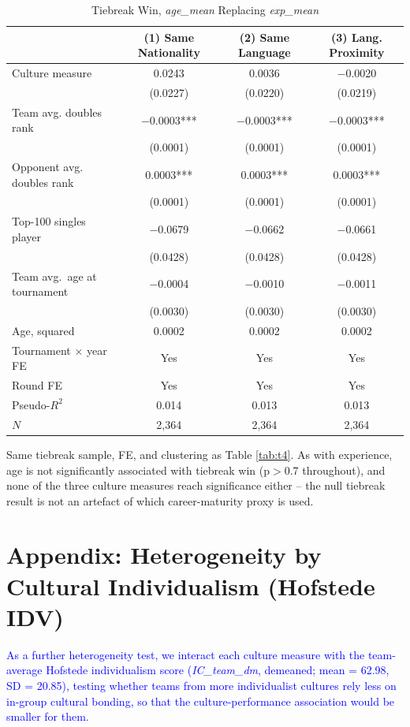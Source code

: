 \documentclass[10pt]{article}
\begin{document}
\begin{table}[htbp]
\color{blue}
\centering
\caption{Tiebreak Win, \textit{age\_mean} Replacing \textit{exp\_mean} \label{tab:ta3}}
\begin{threeparttable}
\begin{tabular}{lccc}
\toprule
 & (1) Same Nationality & (2) Same Language & (3) Lang. Proximity \\
\midrule
Culture measure & 0.0243 & 0.0036 & $-$0.0020 \\
 & (0.0227) & (0.0220) & (0.0219) \\
Team avg. doubles rank & $-$0.0003*** & $-$0.0003*** & $-$0.0003*** \\
 & (0.0001) & (0.0001) & (0.0001) \\
Opponent avg. doubles rank & 0.0003*** & 0.0003*** & 0.0003*** \\
 & (0.0001) & (0.0001) & (0.0001) \\
Top-100 singles player & $-$0.0679 & $-$0.0662 & $-$0.0661 \\
 & (0.0428) & (0.0428) & (0.0428) \\
Team avg.\ age at tournament & $-$0.0004 & $-$0.0010 & $-$0.0011 \\
 & (0.0030) & (0.0030) & (0.0030) \\
Age, squared & 0.0002 & 0.0002 & 0.0002 \\
\midrule
Tournament $\times$ year FE & Yes & Yes & Yes \\
Round FE & Yes & Yes & Yes \\
Pseudo-$R^2$ & 0.014 & 0.013 & 0.013 \\
$N$ & 2,364 & 2,364 & 2,364 \\
\bottomrule
\end{tabular}
\begin{tablenotes}
\small
\item Same tiebreak sample, FE, and clustering as Table \ref{tab:t4}. As with experience, age is not significantly associated with tiebreak win (p$>$0.7 throughout), and none of the three culture measures reach significance either -- the null tiebreak result is not an artefact of which career-maturity proxy is used.
\end{tablenotes}
\end{threeparttable}
\end{table}
\FloatBarrier

\section{Appendix: Heterogeneity by Cultural Individualism (Hofstede IDV)}
\textcolor{blue}{As a further heterogeneity test, we interact each culture measure with the team-average Hofstede individualism score (\textit{IC\_team\_dm}, demeaned; mean = 62.98, SD = 20.85), testing whether teams from more individualist cultures rely less on in-group cultural bonding, so that the culture-performance association would be smaller for them.}
\end{document}
